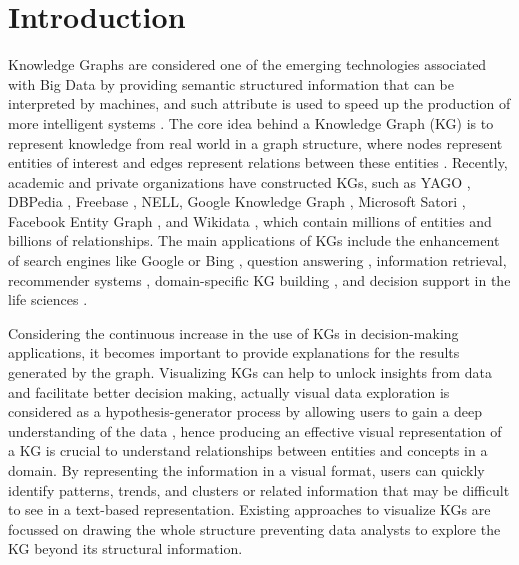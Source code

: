 \documentclass{ieeeaccess}
\begin{document}
\section{Introduction}
\label{sec:introduction}

Knowledge Graphs are considered one of the emerging technologies associated
with Big Data by providing semantic structured information that can be 
interpreted by machines, and such attribute is used to speed up the production
of more intelligent systems \cite{Zou_2020}. The core idea behind a Knowledge 
Graph (KG) is to represent knowledge from real world in a graph structure, 
where nodes represent entities of interest and edges represent relations 
between these entities \cite{Hogan21}. Recently, 
academic and private organizations have constructed KGs, such as YAGO 
\cite{suchanek2007yago}, DBPedia \cite{auer2007dbpedia}, Freebase 
\cite{Freebase08}, NELL\cite{NELL10}, Google Knowledge Graph 
\cite{GoogleKG12}, Microsoft Satori \cite{Satori13}, Facebook Entity
Graph \cite{Facebook13}, and Wikidata \cite{Wikidata14}, which contain
millions of entities and billions of relationships. The main applications 
of KGs include the enhancement of search engines like Google \cite{GoogleKG12}
or Bing \cite{Satori13}, question answering \cite{Chen2022}, information 
retrieval, recommender systems \cite{Lin2022, Haotian2022}, domain-specific KG 
building \cite{Zhang2022, Borrego2022, Guan2022}, and decision support in the 
life sciences \cite{Zou_2020,Belleau08,Ruttenberg09,Momtchev09}.

Considering the continuous increase in the use of KGs in 
decision-making applications, it becomes important to 
provide explanations for the results generated by the 
graph. Visualizing KGs can help to unlock insights from 
data and facilitate better decision making, actually 
visual data exploration is considered as a 
hypothesis-generator process by allowing users to gain
a deep understanding of the data \cite{keim2001visual},
hence producing an effective visual representation of 
a KG is crucial to understand relationships between 
entities and concepts in a domain. By representing the
information in a visual format, users can quickly identify
patterns, trends, and clusters or related information 
that may be difficult to see in a text-based representation. 
Existing approaches to visualize KGs are focussed on 
drawing the whole structure \cite{gomez2018visualizing} 
preventing data analysts to explore the KG beyond its 
structural information.
\end{document}
